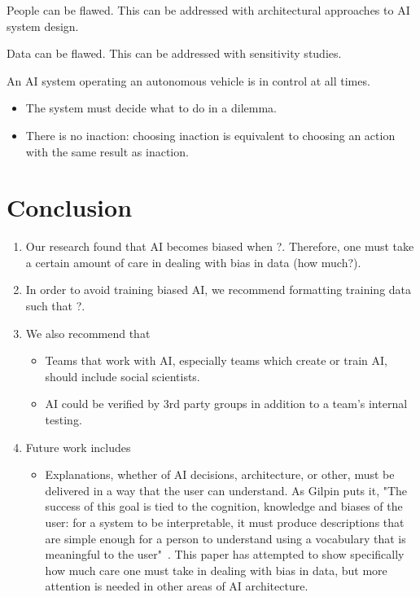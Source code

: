 \documentclass{report}
\begin{document}
People can be flawed. This can be addressed with architectural approaches to AI system design.

Data can be flawed. This can be addressed with sensitivity studies.

An AI system operating an autonomous vehicle is in control at all times.
\begin{itemize}
    \item The system must decide what to do in a dilemma.
    \item There is no inaction: choosing inaction is equivalent to choosing an action with the same
    result as inaction.
\end{itemize}

\FloatBarrier
\chapter{Conclusion}

\begin{enumerate}
    \item Our research found that AI becomes biased when ?. Therefore, one must take a certain
    amount of care in dealing with bias in data (how much?).
    
    \item In order to avoid training biased AI, we recommend formatting training data such that ?.
    
    \item We also recommend that
    \begin{itemize}
        \item Teams that work with AI, especially teams which create or train AI, should include
        social scientists.
        
        \item AI could be verified by 3rd party groups in addition to a team's internal testing.
    \end{itemize}

    \item Future work includes
    \begin{itemize}
        \item Explanations, whether of AI decisions, architecture, or other, must be delivered in a
        way that the user can understand. As Gilpin puts it, "The success of this goal is tied to
        the cognition, knowledge and biases of the user: for a system to be interpretable, it must
        produce descriptions that are simple enough for a person to understand using a vocabulary
        that is meaningful to the user"~\cite{gilpin2018explaining}. This paper has attempted to
        show specifically how much care one must take in dealing with bias in data, but more
        attention is needed in other areas of AI architecture.
    \end{itemize}
\end{enumerate}
\end{document}
